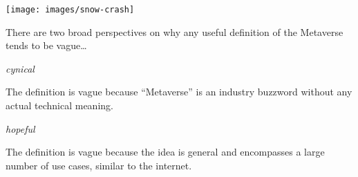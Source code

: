 \documentclass[aspectratio=169,x11names]{beamer}
\def\Put(#1,#2)#3{\leavevmode\makebox(0,0){\put(#1,#2){#3}}}
\begin{document}
\begin{frame}
\begin{minipage}{0.45\textwidth}
\begin{center}
\texttt{[image: images/snow-crash]} 
\end{center}
\end{minipage}%
\begin{minipage}{0.55\textwidth}
\begin{center}
\end{center}
\end{minipage}
\end{frame}


\begin{frame}
There are two broad perspectives on why any useful definition of the Metaverse tends
to be vague\dots\bigskip\bigskip

\begin{minipage}{0.5\textwidth}
\begin{center}
\Large
\emph{cynical}
\normalsize\bigskip

The definition is vague because ``Metaverse'' is an industry buzzword without any
actual technical meaning.
\end{center}
\end{minipage}%
\begin{minipage}{0.5\textwidth}
\begin{center}
\Large
\emph{hopeful}
\normalsize\bigskip

The definition is vague because the idea is general and encompasses a large number of use cases, similar to the internet.
\end{center}
\end{minipage}
\end{frame}
\end{document}
